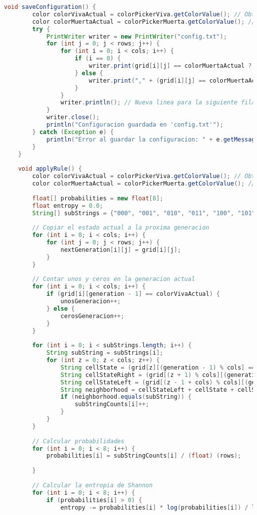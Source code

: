 \documentclass{article}
\begin{document}
\begin{lstlisting}[language=Java, basicstyle=\tiny, breaklines=true, breakatwhitespace=true]
	void saveConfiguration() {
		color colorVivaActual = colorPickerViva.getColorValue(); // Obtener el color actual de celda viva
		color colorMuertaActual = colorPickerMuerta.getColorValue(); // Obtener el color actual de celda muerta
		try {
			PrintWriter writer = new PrintWriter("config.txt");
			for (int j = 0; j < rows; j++) {
				for (int i = 0; i < cols; i++) {
					if (i == 0) {
						writer.print(grid[i][j] == colorMuertaActual ? "0" : "1");
					} else {
						writer.print("," + (grid[i][j] == colorMuertaActual ? "0" : "1"));
					}
				}
				writer.println(); // Nueva linea para la siguiente fila
			}
			writer.close();
			println("Configuracion guardada en 'config.txt'");
		} catch (Exception e) {
			println("Error al guardar la configuracion: " + e.getMessage());
		}
	}
	
	void applyRule() {
		color colorVivaActual = colorPickerViva.getColorValue(); // Obtener el color actual de celda viva
		color colorMuertaActual = colorPickerMuerta.getColorValue(); // Obtener el color actual de celda muerta
		
		float[] probabilities = new float[8];
		float entropy = 0.0;
		String[] subStrings = {"000", "001", "010", "011", "100", "101", "110", "111"};
		
		// Copiar el estado actual a la proxima generacion
		for (int i = 0; i < cols; i++) {
			for (int j = 0; j < rows; j++) {
				nextGeneration[i][j] = grid[i][j];
			}
		}
		
		// Contar unos y ceros en la generacion actual
		for (int i = 0; i < cols; i++) {
			if (grid[i][generation - 1] == colorVivaActual) {
				unosGeneracion++;
			} else {
				cerosGeneracion++;
			}
		}
		
		for (int i = 0; i < subStrings.length; i++) {
			String subString = subStrings[i];
			for (int z = 0; z < cols; z++) {
				String cellState = (grid[z][(generation - 1) % cols] == colorVivaActual) ? "1" : "0";
				String cellStateRight = (grid[(z + 1) % cols][(generation - 1) % cols] == colorVivaActual) ? "1" : "0";
				String cellStateLeft = (grid[(z - 1 + cols) % cols][(generation - 1) % cols] == colorVivaActual) ? "1" : "0";
				String neighborhood = cellStateLeft + cellState + cellStateRight;
				if (neighborhood.equals(subString)) {
					subStringCounts[i]++;
				}
			}
		}
		
		// Calcular probabilidades
		for (int i = 0; i < 8; i++) {
			probabilities[i] = subStringCounts[i] / (float) (rows);
			
		}
		
		// Calcular la entropia de Shannon
		for (int i = 0; i < 8; i++) {
			if (probabilities[i] > 0) {
				entropy -= probabilities[i] * log(probabilities[i]) / log(2);
				

\end{lstlisting}
\end{document}
